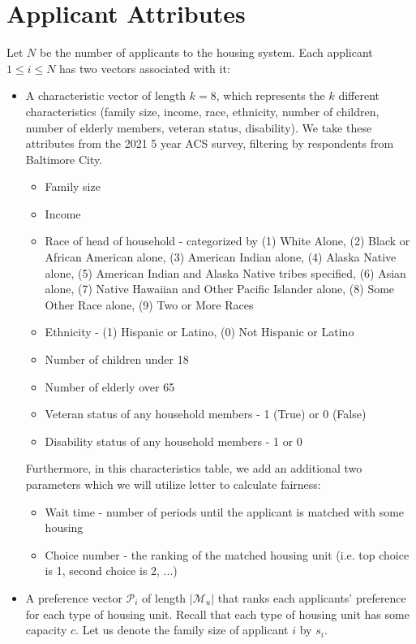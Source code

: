 \documentclass[11pt]{article}
\begin{document}
\section{Applicant Attributes}
Let $N$ be the number of applicants to the housing system. Each applicant $1 \leq i \leq N$ has two vectors associated with it: 
\begin{itemize}
    \item A characteristic vector of length $k = 8$, which represents the $k$ different characteristics (family size, income, race, ethnicity, number of children, number of elderly members, veteran status, disability). We take these attributes from the 2021 5 year ACS survey, filtering by respondents from Baltimore City.
    \begin{itemize}
        \item Family size 
        \item Income
        \item Race of head of household - categorized by (1) White Alone, (2) Black or African American alone, (3) American Indian alone, (4) Alaska Native alone, (5) American Indian and Alaska Native tribes specified, (6) Asian alone, (7) Native Hawaiian and Other Pacific Islander alone, (8) Some Other Race alone, (9) Two or More Races
        \item Ethnicity - (1) Hispanic or Latino, (0) Not Hispanic or Latino
        \item Number of children under 18
        \item Number of elderly over 65
        \item Veteran status of any household members - 1 (True) or 0 (False)
        \item Disability status of any household members - 1 or 0
    \end{itemize}
    Furthermore, in this characteristics table, we add an additional two parameters which we will utilize letter to calculate fairness:
    \begin{itemize}
        \item Wait time - number of periods until the applicant is matched with some housing
        \item Choice number - the ranking of the matched housing unit (i.e. top choice is 1, second choice is 2, ...)
    \end{itemize}
    \item A preference vector $\mathcal{P}_i$ of length $|\mathcal{M}_u|$ that ranks each applicants' preference for each type of housing unit. Recall that each type of housing unit has some capacity $c$. Let us denote the family size of applicant $i$ by $s_i$. \\

\end{itemize}
\end{document}
